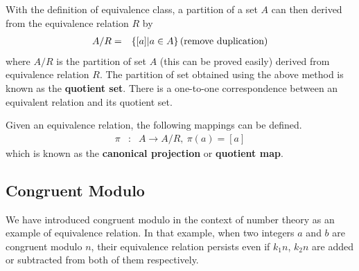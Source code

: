 With the definition of equivalence class, a partition of a set $A$ can then derived from the equivalence relation $R$ by
\begin{eqnarray}
	A/R &=& \left\{[a] | a \in A \right\} \textup{(remove duplication)} \label{eq:quotient_set}
\end{eqnarray}
where $A/R$ is the partition of set $A$ (this can be proved easily) derived from equivalence relation $R$. The partition of set obtained using the above method is known as the \textbf{quotient set}. There is a one-to-one correspondence between an equivalent relation and its quotient set.

Given an equivalence relation, the following mappings can be defined.
\begin{eqnarray}
	\pi &:& A \rightarrow A/R, ~\pi(a) = [a] \nonumber
\end{eqnarray}
which is known as the \textbf{canonical projection} or \textbf{quotient map}.

\subsection{Congruent Modulo}

We have introduced congruent modulo in the context of number theory as an example of equivalence relation. In that example, when two integers $a$ and $b$ are congruent modulo $n$, their equivalence relation persists even if $k_1n$, $k_2n$ are added or subtracted from both of them respectively.

